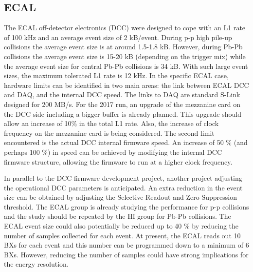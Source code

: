 \subsection{ECAL\label{subsec:ECAL}} 
The ECAL off-detector electronics (DCC) were designed to cope with an L1 rate of 100 kHz and an average event size of 2 kB/event. 
During p-p high pile-up collisions the average event size is at around 1.5-1.8 kB. However, during Pb-Pb collisions the average event size is 15-20 kB (depending on the trigger mix) while the
average event size for central Pb-Pb collisions is 34 kB. With such large event sizes, the maximum tolerated L1 rate is
12 kHz. In the specific ECAL case, hardware limits can be identified in two main areas: the link between ECAL DCC and
DAQ, and the internal DCC speed. The links to DAQ are standard S-Link designed for 200 MB/s. For the 2017 run, an
upgrade of the mezzanine card on the DCC side including a bigger buffer is already planned. This upgrade should allow an
increase of 10\% in the total L1 rate. Also, the increase of clock frequency on the mezzanine card is being considered.
The second limit encountered is the actual DCC internal firmware speed. An increase of 50 \% (and perhaps 100 \%) in
speed can be achieved by modifying the internal DCC firmware structure, allowing the firmware to run at a higher clock
frequency.

In parallel to the DCC firmware development project, another project adjusting the operational DCC parameters is
anticipated. An extra reduction in the event size can be obtained by adjusting the Selective Readout and Zero
Suppression threshold. The ECAL group is already studying the performance for p-p collisions and the study should be
repeated by the HI group for Pb-Pb collisions. The ECAL event size could also potentially be reduced up to 40 \% by
reducing the number of samples collected for each event. At present, the ECAL reads out 10 BXs for each event and this
number can be programmed down to a minimum of 6 BXs. However, reducing the number of samples could have strong
implications for the energy resolution. 






